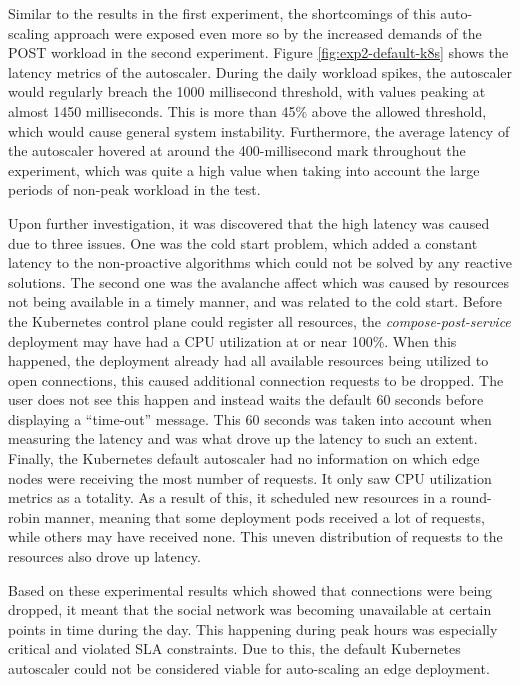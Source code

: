 Similar to the results in the first experiment, the shortcomings of this auto-scaling approach were exposed even more so by the increased demands of the POST workload in the second experiment. Figure \ref{fig:exp2-default-k8s} shows the latency metrics of the autoscaler. During the daily workload spikes, the autoscaler would regularly breach the 1000 millisecond threshold, with values peaking at almost 1450 milliseconds. This is more than 45\% above the allowed threshold, which would cause general system instability. Furthermore, the average latency of the autoscaler hovered at around the 400-millisecond mark throughout the experiment, which was quite a high value when taking into account the large periods of non-peak workload in the test.\par

Upon further investigation, it was discovered that the high latency was caused due to three issues. One was the cold start problem, which added a constant latency to the non-proactive algorithms which could not be solved by any reactive solutions. The second one was the avalanche affect which was caused by resources not being available in a timely manner, and was related to the cold start. Before the Kubernetes control plane could register all resources, the \textit{compose-post-service} deployment may have had a CPU utilization at or near 100\%. When this happened, the deployment already had all available resources being utilized to open connections, this caused additional connection requests to be dropped. The user does not see this happen and instead waits the default 60 seconds before displaying a ``time-out'' message. This 60 seconds was taken into account when measuring the latency and was what drove up the latency to such an extent. Finally, the Kubernetes default autoscaler had no information on which edge nodes were receiving the most number of requests. It only saw CPU utilization metrics as a totality. As a result of this, it scheduled new resources in a round-robin manner, meaning that some deployment pods received a lot of requests, while others may have received none. This uneven distribution of requests to the resources also drove up latency.\par

Based on these experimental results which showed that connections were being dropped, it meant that the social network was becoming unavailable at certain points in time during the day. This happening during peak hours was especially critical and violated SLA constraints. Due to this, the default Kubernetes autoscaler could not be considered viable for auto-scaling an edge deployment.


